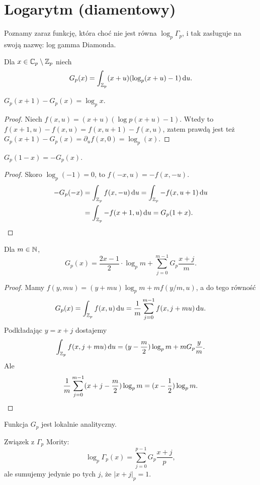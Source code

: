 \section{Logarytm (diamentowy)}
Poznamy zaraz funkcję, która choć nie jest równa $\log_p \Gamma_p$, i tak zasługuje na swoją nazwę: log gamma Diamonda.

\begin{definicja}
	Dla $x \in \mathbb C_p \setminus \mathbb Z_p$ niech
	\[
		G_p(x) = \int_{\mathbb Z_p} (x+u) (\log_p (x+u) - 1) \,\textrm{d}u.
	\]
\end{definicja}

\begin{fakt}
	$G_p(x+1) - G_p(x) = \log_p x$.
\end{fakt}

\begin{proof}
	Niech $f(x, u) = (x+u)(\log p(x+u) - 1)$.
	Wtedy to $f(x + 1, u) - f(x, u) = f(x, u + 1) - f(x, u)$, zatem prawdą jest też $G_p(x+1) - G_p(x) = \partial_uf(x, 0) = \log_p(x)$.
\end{proof}

\begin{fakt}
	$G_p(1-x) = - G_p(x)$.
\end{fakt}

\begin{proof}
	Skoro $\log_p(-1) = 0$, to $f(-x, u) = - f(x, -u)$.
	\begin{align*}
		- G_p (-x) & = \int_{\mathbb Z_p} f(x, -u) \,\textrm{d}u
		= \int_{\mathbb Z_p} -f(x, u+1) \,\textrm{d}u \\
		& =  \int_{\mathbb Z_p} -f(x+1, u) \,\textrm{d}u
		= G_p(1+x). \qedhere
	\end{align*}
\end{proof}

\begin{fakt}
	Dla $m \in \mathbb N$,
	\[
		G_p(x) = \frac{2x-1}{2} \cdot \log_p m + \sum_{j=0}^{m-1} G_p \frac{x+j}{m}.
	\]
\end{fakt}

\begin{proof}
	Mamy $f(y, mu) = (y + mu) \log_p m + m f(y/m, u)$, a do tego równość
	\[
		G_p(x) = \int_{\mathbb Z_p} f(x, u) \,\textrm{d}u = \frac 1m \sum_{j = 0}^{m-1} f(x, j+mu) \,\textrm{d}u.
	\]
	Podkładając $y = x+j$ dostajemy
	\[
		\int_{\mathbb Z_p} f(x, j + mu) \,\textrm{d} u = (y - \frac m 2) \log_p m + m G_p \frac{y}{m}.
	\]
	Ale
	\[
		\frac 1m \sum_{j=0}^{m-1} (x + j - \frac m2) \log_pm = (x - \frac 12) \log_p m. \qedhere
	\]
\end{proof}

\begin{fakt}
	Funkcja $G_p$ jest lokalnie analityczny.
\end{fakt}

\begin{fakt}
	Związek z $\Gamma_p$ Mority:
	\[
		\log_p \Gamma_p (x) = \sum_{j=0}^{p-1} G_p \frac{x+j}{p},
	\]
	ale sumujemy jedynie po tych $j$, że $|x + j|_p = 1$.
\end{fakt}